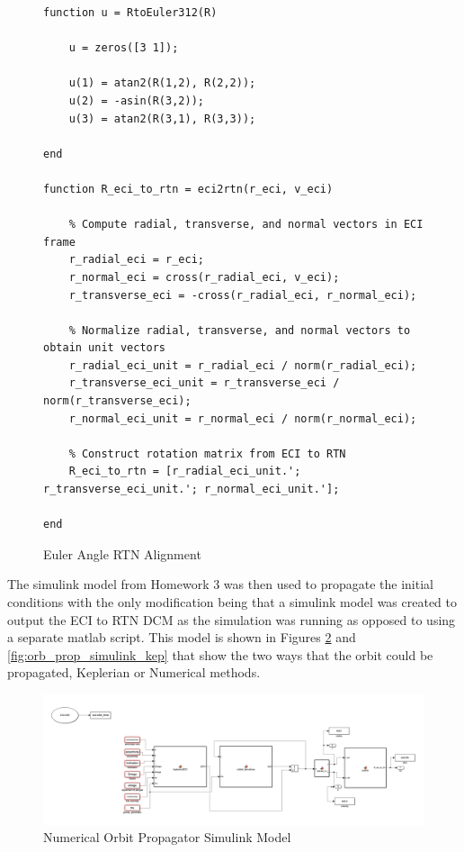 \begin{figure} [H]
    \centering
    \begin{lstlisting}
function u = RtoEuler312(R)

    u = zeros([3 1]);

    u(1) = atan2(R(1,2), R(2,2));
    u(2) = -asin(R(3,2));
    u(3) = atan2(R(3,1), R(3,3));

end

function R_eci_to_rtn = eci2rtn(r_eci, v_eci)
    
    % Compute radial, transverse, and normal vectors in ECI frame
    r_radial_eci = r_eci;
    r_normal_eci = cross(r_radial_eci, v_eci);
    r_transverse_eci = -cross(r_radial_eci, r_normal_eci);
    
    % Normalize radial, transverse, and normal vectors to obtain unit vectors
    r_radial_eci_unit = r_radial_eci / norm(r_radial_eci);
    r_transverse_eci_unit = r_transverse_eci / norm(r_transverse_eci);
    r_normal_eci_unit = r_normal_eci / norm(r_normal_eci);
    
    % Construct rotation matrix from ECI to RTN
    R_eci_to_rtn = [r_radial_eci_unit.'; r_transverse_eci_unit.'; r_normal_eci_unit.'];

end
    \end{lstlisting}
    \caption{Euler Angle RTN Alignment}
    \label{fig:euler_angle_prop_model}
\end{figure}

The simulink model from Homework 3 was then used to propagate the initial conditions with the only modification being that a simulink model was created to output the ECI to RTN DCM as the simulation was running as opposed to using a separate matlab script. This model is shown in Figures \ref{fig:orb_prop_simulink_num} and \ref{fig:orb_prop_simulink_kep} that show the two ways that the orbit could be propagated, Keplerian or Numerical methods.

\begin{figure}[H]
    \centering
    \captionsetup{ justification = centering}
    \includegraphics[width = 15cm]{Images/PS4/orbital_prop_simulink_num.png}
    \caption{Numerical Orbit Propagator Simulink Model}
    \label{fig:orb_prop_simulink_num}
\end{figure}

